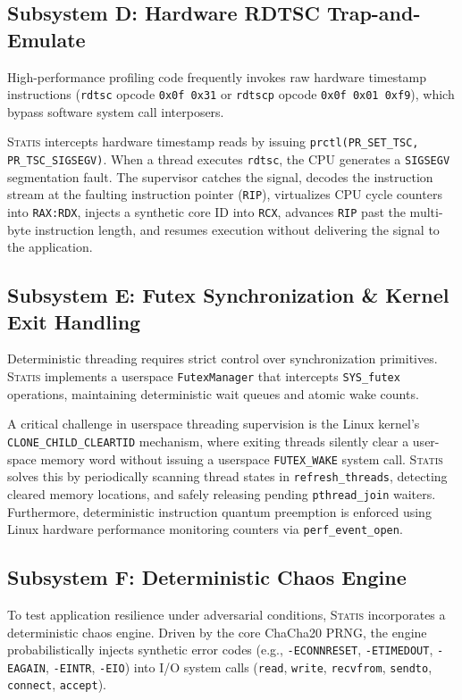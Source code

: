 \documentclass[twocolumn,10pt,sigconf,nonacm]{acmart}
\begin{document}
\subsection{Subsystem D: Hardware RDTSC Trap-and-Emulate}
High-performance profiling code frequently invokes raw hardware timestamp instructions (\texttt{rdtsc} opcode \texttt{0x0f 0x31} or \texttt{rdtscp} opcode \texttt{0x0f 0x01 0xf9}), which bypass software system call interposers.

\textsc{Statis} intercepts hardware timestamp reads by issuing \texttt{prctl(PR\_SET\_TSC, PR\_TSC\_SIGSEGV)}. When a thread executes \texttt{rdtsc}, the CPU generates a \texttt{SIGSEGV} segmentation fault. The supervisor catches the signal, decodes the instruction stream at the faulting instruction pointer (\texttt{RIP}), virtualizes CPU cycle counters into \texttt{RAX:RDX}, injects a synthetic core ID into \texttt{RCX}, advances \texttt{RIP} past the multi-byte instruction length, and resumes execution without delivering the signal to the application.

\subsection{Subsystem E: Futex Synchronization \& Kernel Exit Handling}
Deterministic threading requires strict control over synchronization primitives. \textsc{Statis} implements a userspace \texttt{FutexManager} that intercepts \texttt{SYS\_futex} operations, maintaining deterministic wait queues and atomic wake counts.

A critical challenge in userspace threading supervision is the Linux kernel's \texttt{CLONE\_CHILD\_CLEARTID} mechanism, where exiting threads silently clear a user-space memory word without issuing a userspace \texttt{FUTEX\_WAKE} system call. \textsc{Statis} solves this by periodically scanning thread states in \texttt{refresh\_threads}, detecting cleared memory locations, and safely releasing pending \texttt{pthread\_join} waiters. Furthermore, deterministic instruction quantum preemption is enforced using Linux hardware performance monitoring counters via \texttt{perf\_event\_open}.

\subsection{Subsystem F: Deterministic Chaos Engine}
To test application resilience under adversarial conditions, \textsc{Statis} incorporates a deterministic chaos engine. Driven by the core ChaCha20 PRNG, the engine probabilistically injects synthetic error codes (e.g., \texttt{-ECONNRESET}, \texttt{-ETIMEDOUT}, \texttt{-EAGAIN}, \texttt{-EINTR}, \texttt{-EIO}) into I/O system calls (\texttt{read}, \texttt{write}, \texttt{recvfrom}, \texttt{sendto}, \texttt{connect}, \texttt{accept}).
\end{document}
